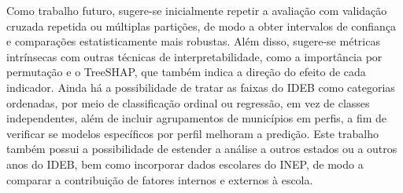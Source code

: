 Como trabalho futuro, sugere-se inicialmente repetir a avaliação com validação cruzada repetida ou múltiplas partições, de modo a obter intervalos de confiança e comparações estatisticamente mais robustas. Além disso, sugere-se métricas intrínsecas com outras técnicas de interpretabilidade, como a importância por permutação e o TreeSHAP, que também indica a direção do efeito de cada indicador. Ainda há a possibilidade de tratar as faixas do IDEB como categorias ordenadas, por meio de classificação ordinal ou regressão, em vez de classes independentes, além de incluir agrupamentos de municípios em perfis, a fim de verificar se modelos específicos por perfil melhoram a predição. Este trabalho também possui a possibilidade de estender a análise a outros estados ou a outros anos do IDEB, bem como incorporar dados escolares do INEP, de modo a comparar a contribuição de fatores internos e externos à escola.



